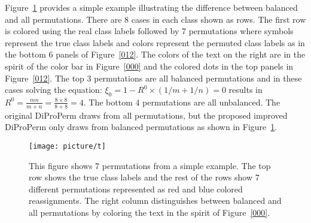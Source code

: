 \documentclass[12pt]{article}
\begin{document}
{Figure~\ref{t} provides a simple example illustrating the difference between balanced and all permutations. There are 8 cases in each class shown as rows. The first row is colored using the real class labels followed by 7 permutations where symbols represent the true class labels and colors represent the permuted class labels as in the bottom 6 panels of Figure~\ref{012}. The colors of the text on the right are in the spirit of the color bar in Figure~\ref{000} and the colored dots in the top panels in Figure~\ref{012}. The top 3 permutations are all balanced permutations and in these cases solving the equation: $\xi_0=1-R^0\times(1/m+1/n)=0$ results in $R^0=\frac{mn}{m+n}=\frac{8\times 8}{8+8}=4$. The bottom 4 permutations are all unbalanced. The original DiProPerm draws from all permutations, but the proposed improved DiProPerm only draws from balanced permutations as shown in Figure~\ref{t}. %
\begin{figure}[H]
  \centering
  \texttt{[image: picture/t]}\\
  \caption{This figure shows 7 permutations from a simple example. The top row shows the true class labels and the rest of the rows show 7 different permutations represented as red and blue colored reassignments. The right column distinguishes between balanced and all permutations by coloring the text in the spirit of Figure~\ref{000}.} %
  \label{t}
\end{figure}

}
\end{document}
